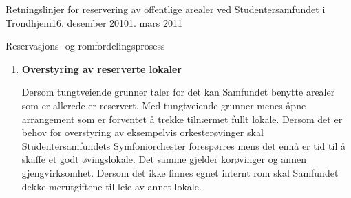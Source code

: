\begin{instruks}{Retningslinjer for reservering av offentlige arealer
    ved Studentersamfundet i Trondhjem}{16. desember 2010}{1. mars 2011}
\begin{instruksledd}{Reservasjons- og romfordelingsprosess}
\begin{enumerate}
                I etterkant av semesterets rombookingsmøte kan Kontrollkontoret
                fortløpende reservere rom
                til interesserte.
                \begin{enumerate}
                    \item  Ledige lokaler tildeles i henhold til normer for
                        prioritering.
                    \item Utlån/-leie skal vanligvis ikke gå på bekostning av interne
                        romreservasjoner. Punkt 5.3 beskriver
                        retningslinjer ved overstyring av reserverte lokaler.
                    \item Romutlån til eksterne arrangementer som ikke står i
                        semesterprogrammet fastsettes endelig to uker før
                        arrangementet.
                    \item Romutleie som ikke står i semesterprogrammet kan fastsettes
                        to måneder før arrangementet dersom særlige
                        grunner taler for det.
                    \item Endringer og informasjon om ledige arealer skal til enhver
                        tid ligge oppdatert på robokop.samfundet.no.
                \end{enumerate}

            \item \textbf{Overstyring av reserverte lokaler}

                Dersom tungtveiende grunner taler for det kan Samfundet benytte
                arealer som er allerede er reservert. Med
                tungtveiende grunner menes åpne arrangement som er forventet å trekke
                tilnærmet fullt lokale. Dersom det er behov
                for overstyring av eksempelvis orkesterøvinger skal
                Studentersamfundets Symfoniorchester forespørres mens det ennå
                er tid til å skaffe et godt øvingslokale. Det samme gjelder korøvinger
                og annen gjengvirksomhet. Dersom det ikke
                finnes egnet internt rom skal Samfundet dekke merutgiftene til leie av
                annet lokale.
        \end{enumerate}

    \end{instruksledd}


\end{instruks}
